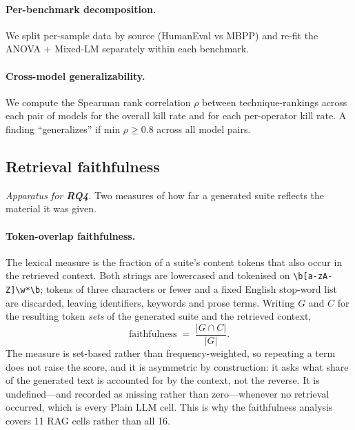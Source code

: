 \documentclass[smallextended]{svjour3}
\begin{document}
\paragraph{Per-benchmark decomposition.}
We split per-sample data by source (HumanEval vs MBPP) and re-fit
the ANOVA + Mixed-LM separately within each benchmark.

\paragraph{Cross-model generalizability.}
We compute the Spearman rank correlation $\rho$ between
technique-rankings across each pair of models for the overall kill
rate and for each per-operator kill rate. A finding ``generalizes''
if min $\rho \geq 0.8$ across all model pairs.

\subsection{Retrieval faithfulness}\label{sec:methods-faithfulness}

\emph{Apparatus for \textbf{RQ4}.} Two measures of how far a generated
suite reflects the material it was given.

\paragraph{Token-overlap faithfulness.} The lexical measure is the
fraction of a suite's content tokens that also occur in the retrieved
context. Both strings are lowercased and tokenised on
\verb|\b[a-zA-Z]\w*\b|; tokens of three characters or fewer and a
fixed English stop-word list are discarded, leaving identifiers,
keywords and prose terms. Writing $G$ and $C$ for the resulting token
\emph{sets} of the generated suite and the retrieved context,
\[
 \mathrm{faithfulness} \;=\; \frac{|G \cap C|}{|G|}.
\]
The measure is set-based rather than frequency-weighted, so repeating
a term does not raise the score, and it is asymmetric by
construction: it asks what share of the generated text is accounted
for by the context, not the reverse. It is undefined---and recorded
as missing rather than zero---whenever no retrieval occurred, which
is every Plain LLM cell. This is why the faithfulness analysis
covers 11 RAG cells rather than all 16.
\end{document}
